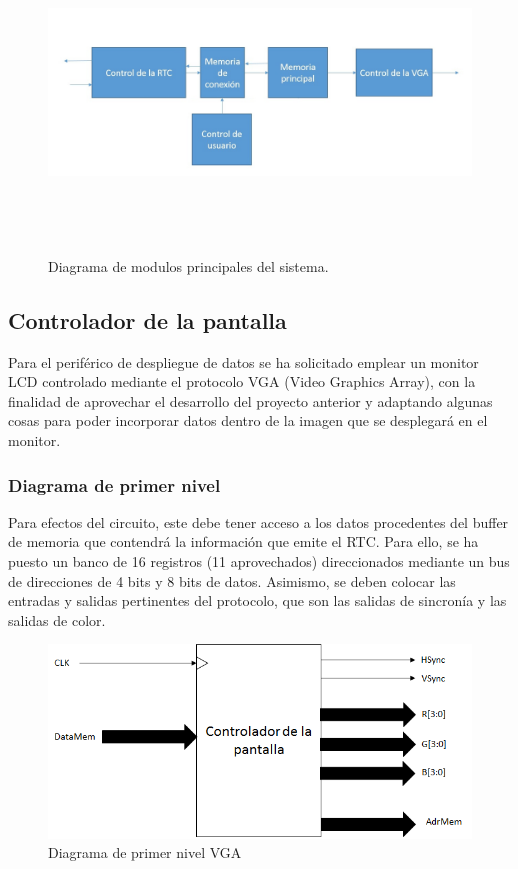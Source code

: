 \documentclass[12pt,a4paper]{article}
\begin{document}
		\begin{figure}[hbtp]
			\centering
			\includegraphics[height=8.5cm, width=18cm]{img/Subsistemas.jpg}
			\caption{Diagrama de modulos principales del sistema.}
			\label{fig:sistema}
		\end{figure}
		
		\subsection{Controlador de la pantalla}
		Para el periférico de despliegue de datos se ha solicitado emplear un monitor LCD controlado mediante el protocolo VGA (Video Graphics Array), con la finalidad de aprovechar el desarrollo del proyecto anterior y adaptando algunas cosas para poder incorporar datos dentro de la imagen que se desplegará en el monitor.
		\subsubsection{Diagrama de primer nivel}  \label{sec:VGA_pn}
		Para efectos del circuito, este debe tener acceso a los datos procedentes del buffer de memoria que contendrá la información que emite el RTC. Para ello, se ha puesto un banco de 16 registros (11 aprovechados) direccionados mediante un bus de direcciones de 4 bits y 8 bits de datos. Asimismo, se deben colocar las entradas y salidas pertinentes del protocolo, que son las salidas de sincronía y las salidas de color. \\[2ex]
		
		\begin{figure}[hbtp]
			\centering
			\includegraphics[width=15cm]{img/VGAPrimerNivel.png}
			\caption{Diagrama de primer nivel VGA}
			\label{fig:vgaPrimerNivel}
		\end{figure}
		
\end{document}
